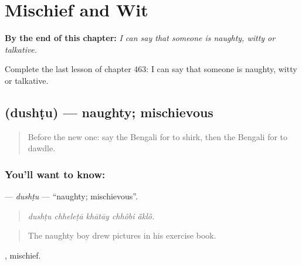 
\chapter{Mischief and Wit}
\label{ch:bn-mischief-and-wit}

\begin{chapteropening}
\textbf{By the end of this chapter:} \emph{I can say that someone is naughty, witty or talkative.}

Complete the last lesson of chapter 463: I can say that someone is naughty, witty or talkative.
\end{chapteropening}

\section[\texorpdfstring{\bn{দুষ্টু} (dushṭu)}{দুষ্টু (dushṭu)}]{ (dushṭu) — naughty; mischievous}

\label{lesson:BN-C463-dushtu}



\begin{quote}
Before the new one: say the Bengali for to shirk, then the Bengali for to dawdle.
\end{quote}

\subsection*{You'll want to know: }
\textbf{} — \emph{dushṭu} — \textquotedblleft{}naughty; mischievous\textquotedblright{}.

\begin{quote}
    
\end{quote}

\begin{quote}
\emph{dushṭu chheleṭā khātāy chhôbi ā̃klô.}
\end{quote}

\begin{quote}
The naughty boy drew pictures in his exercise book.
\end{quote}

, mischief.

